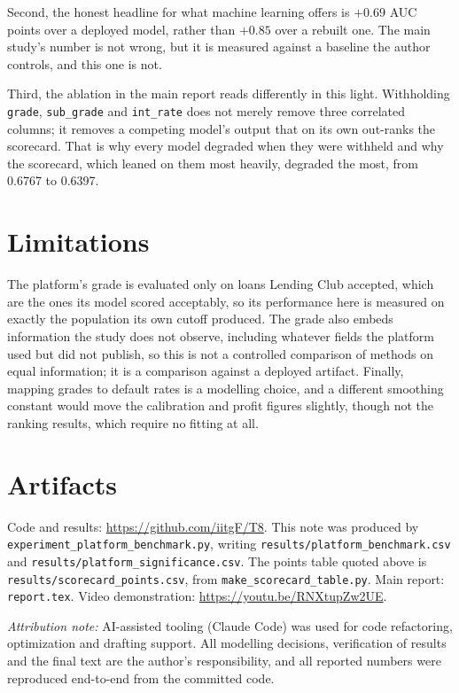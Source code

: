\documentclass[a4paper,twocolumn,10pt]{article}
\begin{document}
Second, the honest headline for what machine learning offers is $+0.69$ AUC points over a deployed model, rather than $+0.85$ over a rebuilt one. The main study's number is not wrong, but it is measured against a baseline the author controls, and this one is not.

Third, the ablation in the main report reads differently in this light. Withholding \texttt{grade}, \texttt{sub\_grade} and \texttt{int\_rate} does not merely remove three correlated columns; it removes a competing model's output that on its own out-ranks the scorecard. That is why every model degraded when they were withheld and why the scorecard, which leaned on them most heavily, degraded the most, from 0.6767 to 0.6397.

\section{Limitations}

The platform's grade is evaluated only on loans Lending Club accepted, which are the ones its model scored acceptably, so its performance here is measured on exactly the population its own cutoff produced. The grade also embeds information the study does not observe, including whatever fields the platform used but did not publish, so this is not a controlled comparison of methods on equal information; it is a comparison against a deployed artifact. Finally, mapping grades to default rates is a modelling choice, and a different smoothing constant would move the calibration and profit figures slightly, though not the ranking results, which require no fitting at all.

\section{Artifacts}

Code and results: \url{https://github.com/iitgF/T8}. This note was produced by \texttt{experiment\_platform\_benchmark.py}, writing \texttt{results/platform\_benchmark.csv} and \texttt{results/platform\_significance.csv}. The points table quoted above is \texttt{results/scorecard\_points.csv}, from \texttt{make\_scorecard\_table.py}. Main report: \texttt{report.tex}. Video demonstration: \url{https://youtu.be/RNXtupZw2UE}.

\vspace{1mm}
\noindent\textit{Attribution note:} AI-assisted tooling (Claude Code) was used for code refactoring, optimization and drafting support. All modelling decisions, verification of results and the final text are the author's responsibility, and all reported numbers were reproduced end-to-end from the committed code.
\end{document}
